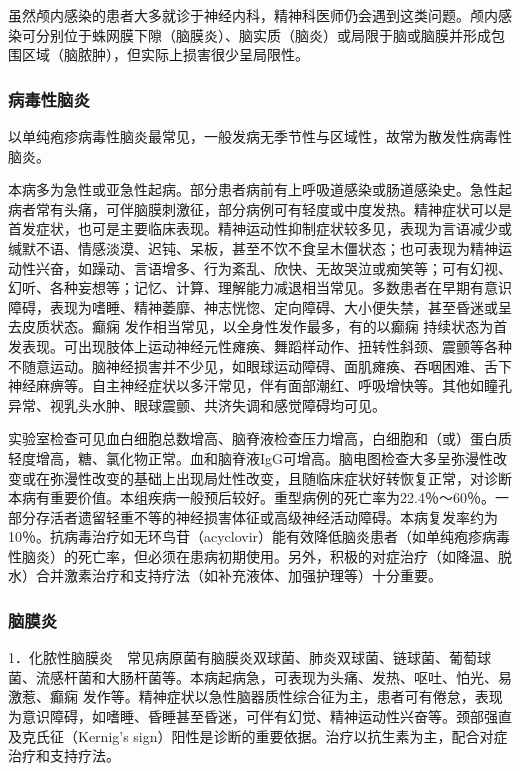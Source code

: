 虽然颅内感染的患者大多就诊于神经内科，精神科医师仍会遇到这类问题。颅内感染可分别位于蛛网膜下隙（脑膜炎）、脑实质（脑炎）或局限于脑或脑膜并形成包围区域（脑脓肿），但实际上损害很少呈局限性。

\subsubsection{病毒性脑炎}

以单纯疱疹病毒性脑炎最常见，一般发病无季节性与区域性，故常为散发性病毒性脑炎。

本病多为急性或亚急性起病。部分患者病前有上呼吸道感染或肠道感染史。急性起病者常有头痛，可伴脑膜刺激征，部分病例可有轻度或中度发热。精神症状可以是首发症状，也可是主要临床表现。精神运动性抑制症状较多见，表现为言语减少或缄默不语、情感淡漠、迟钝、呆板，甚至不饮不食呈木僵状态；也可表现为精神运动性兴奋，如躁动、言语增多、行为紊乱、欣快、无故哭泣或痴笑等；可有幻视、幻听、各种妄想等；记忆、计算、理解能力减退相当常见。多数患者在早期有意识障碍，表现为嗜睡、精神萎靡、神志恍惚、定向障碍、大小便失禁，甚至昏迷或呈去皮质状态。癫痫
发作相当常见，以全身性发作最多，有的以癫痫
持续状态为首发表现。可出现肢体上运动神经元性瘫痪、舞蹈样动作、扭转性斜颈、震颤等各种不随意运动。脑神经损害并不少见，如眼球运动障碍、面肌瘫痪、吞咽困难、舌下神经麻痹等。自主神经症状以多汗常见，伴有面部潮红、呼吸增快等。其他如瞳孔异常、视乳头水肿、眼球震颤、共济失调和感觉障碍均可见。

实验室检查可见血白细胞总数增高、脑脊液检查压力增高，白细胞和（或）蛋白质轻度增高，糖、氯化物正常。血和脑脊液IgG可增高。脑电图检查大多呈弥漫性改变或在弥漫性改变的基础上出现局灶性改变，且随临床症状好转恢复正常，对诊断本病有重要价值。本组疾病一般预后较好。重型病例的死亡率为22.4％～60％。一部分存活者遗留轻重不等的神经损害体征或高级神经活动障碍。本病复发率约为10％。抗病毒治疗如无环鸟苷（acyclovir）能有效降低脑炎患者（如单纯疱疹病毒性脑炎）的死亡率，但必须在患病初期使用。另外，积极的对症治疗（如降温、脱水）合并激素治疗和支持疗法（如补充液体、加强护理等）十分重要。

\subsubsection{脑膜炎}

1．化脓性脑膜炎　常见病原菌有脑膜炎双球菌、肺炎双球菌、链球菌、葡萄球菌、流感杆菌和大肠杆菌等。本病起病急，可表现为头痛、发热、呕吐、怕光、易激惹、癫痫
发作等。精神症状以急性脑器质性综合征为主，患者可有倦怠，表现为意识障碍，如嗜睡、昏睡甚至昏迷，可伴有幻觉、精神运动性兴奋等。颈部强直及克氏征（Kernig's
sign）阳性是诊断的重要依据。治疗以抗生素为主，配合对症治疗和支持疗法。

